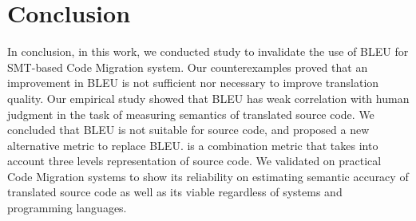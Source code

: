 \section{Conclusion}
In conclusion, in this work, we conducted study to invalidate the use of BLEU for SMT-based Code Migration system. Our counterexamples proved that an improvement in BLEU is not sufficient nor necessary to improve translation quality. Our empirical study showed that BLEU has weak correlation with human judgment in the task of measuring semantics of translated source code. We concluded that BLEU is not suitable for source code, and proposed a new alternative metric {\model} to replace BLEU. {\model} is a combination metric that takes into account three levels representation of source code. We validated {\model} on practical Code Migration systems to show its reliability on estimating semantic accuracy of translated source code as well as its viable regardless of systems and programming languages. 